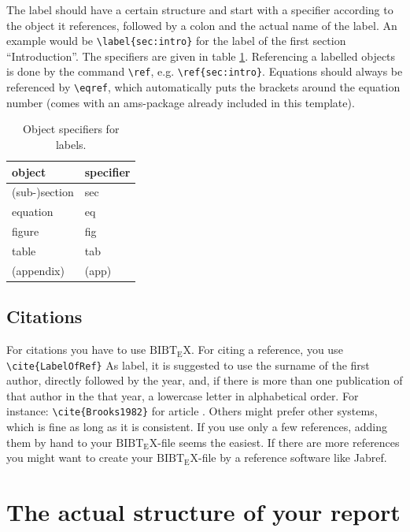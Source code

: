 \documentclass[12pt,a4paper]{article}
\makeatletter
\newcommand{\BibTeX}{$\mathrm{B{\scriptstyle{IB}} \! T\!_{\displaystyle E} \! X}$}
\renewcommand{\cleardoublepage}{\clearpage\if@twoside \ifodd\c@page\else
  \hbox{}
  \vspace*{\fill}
  \thispagestyle{empty}
  \newpage
  \if@twocolumn\hbox{}\newpage\fi\fi\fi}
\makeatother
\begin{document}
The label should have a certain structure and start with a specifier
according to the object it references, followed by a colon and the actual name
of the label. An example would be \verb!\label{sec:intro}! for the label of
the first section ``Introduction''. The specifiers are given in table
\ref{tab:labelspec}. Referencing a labelled objects is done by the command
\verb!\ref!, e.g. \verb!\ref{sec:intro}!. Equations should always be
referenced by \verb!\eqref!, which automatically puts the brackets around the
equation number (comes with an ams-package already included in this
template).

\begin{table}[h]
  \centering
  \begin{tabular}{|l|l|}\hline
    \bf object & \bf specifier \\\hline
    (sub-)section & sec\\
    equation & eq\\
    figure & fig\\
    table & tab\\ 
    (appendix) & (app)\\ \hline
  \end{tabular}
  \caption{Object specifiers for labels.}
  \label{tab:labelspec}
\end{table}

\subsection{Citations}
\label{sec:cite}

For citations you have to use \BibTeX. For citing a reference, you use
\verb!\cite{LabelOfRef}! As label, it is suggested to use the surname of the
first author, directly followed by the year, and, if there is more than one
publication of that author in the that year, a lowercase letter in
alphabetical order. For instance: \verb!\cite{Brooks1982}! for article
\cite{Brooks1982}. Others might prefer other systems, which is fine as long
as it is consistent. If you use only a few references, adding them by hand to
your \BibTeX-file seems the easiest. If there are more references you
might want to create your \BibTeX-file by a reference software like Jabref.



\cleardoublepage
\section{The actual structure of your report} %
\label{sec:developments}
\end{document}
